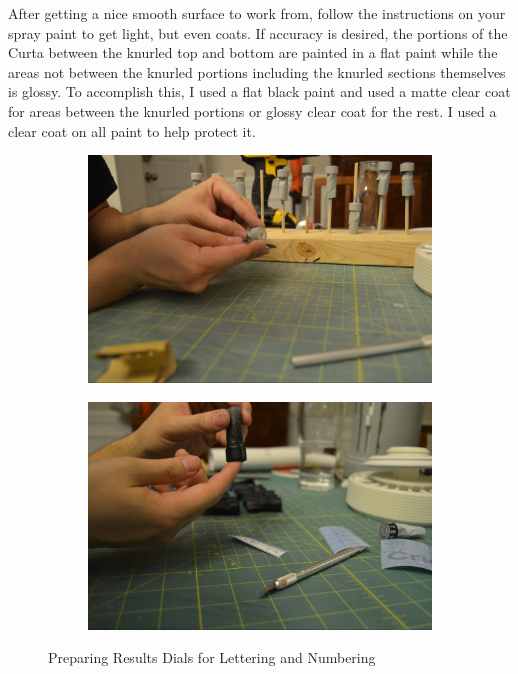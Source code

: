 \documentclass[openany]{book}
\begin{document}
After getting a nice smooth surface to work from, follow the instructions on your spray paint to get light, but even coats. If accuracy is desired, the portions of the Curta between the knurled top and bottom are painted in a flat paint while the areas not between the knurled portions including the knurled sections themselves is glossy. To accomplish this, I used a flat black paint and used a matte clear coat for areas between the knurled portions or glossy clear coat for the rest. I used a clear coat on all paint to help protect it.
\begin{figure}[!ht]
	\centering
	\begin{subfigure}{.4\textwidth}
		\centering
		\includegraphics[width=.95\textwidth]{images/image42.jpg}
		\label{fig:image42}	
	\end{subfigure}
	\begin{subfigure}{.4\textwidth}
		\centering
		\includegraphics[width=.95\textwidth]{images/image34.jpg}
		\label{fig:image34}	
	\end{subfigure}
	\caption{Preparing Results Dials for Lettering and Numbering}
\end{figure}
\end{document}
